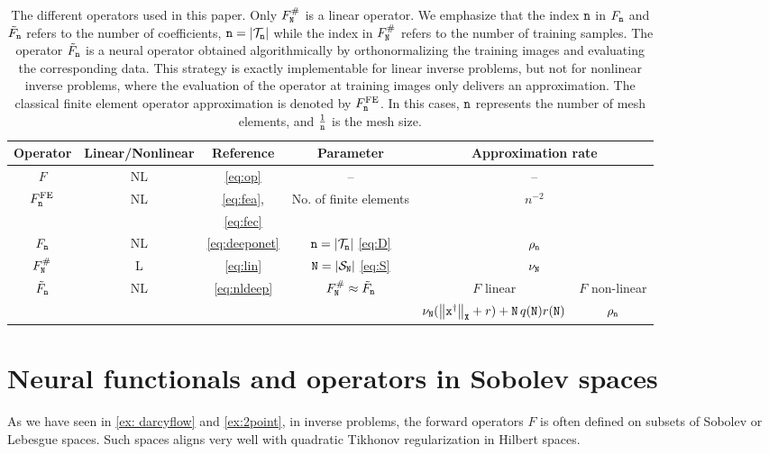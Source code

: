 \documentclass[10pt]{article}
\numberwithin{equation}{section}
\theoremstyle{nonumberplain}
\newcommand{\abs}[1]{\left|#1\right|}
\newcommand{\norm}[1]{\left\|#1\right\|}
\newcommand{\X}{{\tt X}}
\newcommand{\n}{{\tt n}}
\newcommand{\x}{{\tt x}}
\newcommand{\xdag}{\x^\dagger}
\newcommand{\no}{{\tt N}}
\renewcommand{\arraystretch}{1.5}
\begin{document}
\begin{table}[h!]
   \centering \footnotesize
			\renewcommand{\arraystretch}{1.2} 
	\begin{tabular}{|c|c|c|c|c|c|}
		\hline
		Operator &  Linear/Nonlinear & Reference & Parameter & \multicolumn{2}{c|}{Approximation rate} \\
		\hline
		$F$ & NL & \autoref{eq:op} & -- & \multicolumn{2}{c|}{--} \\
		\hline
		\multirow{2}{*}{$F^{\text{FE}}_\n$} & \multirow{2}{*}{NL} & \autoref{eq:fea}, & \multirow{2}{*}{No. of finite elements} & \multicolumn{2}{c|}{\multirow{2}{*}{$n^{-2}$}}  \\
		& & \autoref{eq:fec} & & \multicolumn{2}{c|}{ } \\
		\hline
		$F_\n$ & NL & \autoref{eq:deeponet} & $\n = \abs{\mathcal{T}_\n}$ \autoref{eq:D} & \multicolumn{2}{c|}{$\rho_\n$} \\
		\hline
		$F_{\no}^\#$ & L & \autoref{eq:lin} & $\no = \abs{\mathcal{S}_{\no}}$ \autoref{eq:S} & \multicolumn{2}{c|}{$\nu_{\no}$} \\
		\hline
		\multirow{2}{*}{$\tilde{F}_\n$} & \multirow{2}{*}{NL} & \multirow{2}{*}{\autoref{eq:nldeep}} & \multirow{2}{*}{$F_{\no}^\# \approx \tilde{F}_\n$}
		& $F$ linear
		& $F$ non-linear
		\\ \cline{5-6}
		 &  & & 
		& $\nu_{\no}(\norm{\xdag}_{\X}+r)+\no\,q(\no)r(\no)$
		& $\rho_\n$
		\\
		\hline
	\end{tabular}
	\caption{\label{ta:operators} The different operators used in this paper. Only $F_\no^\#$ is a linear operator. We emphasize that the index $\n$ in $F_\n$ and $\tilde{F}_\n$ refers to the number of coefficients, $\n=\abs{\mathcal{T}_\n}$ while the index in $F_\no^\#$ refers to the number of training samples. The operator $\tilde{F}_\n$ is a neural operator obtained algorithmically by orthonormalizing the training images and evaluating the corresponding data. This strategy is exactly implementable for linear inverse problems, but not for nonlinear inverse problems, where the evaluation of the operator at training images only delivers an approximation. The classical finite element operator approximation is denoted by $F^{\text{FE}}_\n$. In this cases, $\n$ represents the number of mesh elements, and $\frac{1}{\n}$ is the mesh size. }
\end{table}

\section{Neural functionals and operators in Sobolev spaces} \label{sec:basisrep}
As we have seen in \autoref{ex: darcyflow} and \autoref{ex:2point}, in inverse problems, the forward operators $F$ is often defined on subsets of Sobolev or Lebesgue spaces. Such spaces aligns very well with quadratic Tikhonov regularization in Hilbert spaces.
\end{document}
